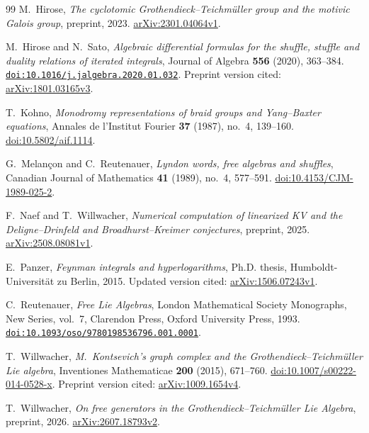 \documentclass[11pt]{article}
\theoremstyle{definition}
\theoremstyle{remark}
\numberwithin{equation}{section}
\begin{document}
\begin{thebibliography}{99}
M.~Hirose,
\emph{The cyclotomic Grothendieck--Teichm\"uller group and the motivic
Galois group},
preprint, 2023.
\href{https://arxiv.org/abs/2301.04064v1}{arXiv:2301.04064v1}.

M.~Hirose and N.~Sato,
\emph{Algebraic differential formulas for the shuffle, stuffle and duality
relations of iterated integrals},
Journal of Algebra \textbf{556} (2020), 363--384.
\href{https://doi.org/10.1016/j.jalgebra.2020.01.032}{\nolinkurl{doi:10.1016/j.jalgebra.2020.01.032}}.
Preprint version cited:
\href{https://arxiv.org/abs/1801.03165v3}{arXiv:1801.03165v3}.

T.~Kohno,
\emph{Monodromy representations of braid groups and Yang--Baxter equations},
Annales de l'Institut Fourier \textbf{37} (1987), no.~4, 139--160.
\href{https://doi.org/10.5802/aif.1114}{doi:10.5802/aif.1114}.

G.~Melan\c{c}on and C.~Reutenauer,
\emph{Lyndon words, free algebras and shuffles},
Canadian Journal of Mathematics \textbf{41} (1989), no.~4, 577--591.
\href{https://doi.org/10.4153/CJM-1989-025-2}{doi:10.4153/CJM-1989-025-2}.

F.~Naef and T.~Willwacher,
\emph{Numerical computation of linearized KV and the Deligne--Drinfeld and
Broadhurst--Kreimer conjectures},
preprint, 2025.
\href{https://arxiv.org/abs/2508.08081v1}{arXiv:2508.08081v1}.

E.~Panzer,
\emph{Feynman integrals and hyperlogarithms},
Ph.D. thesis, Humboldt-Universit\"at zu Berlin, 2015.
Updated version cited:
\href{https://arxiv.org/abs/1506.07243v1}{arXiv:1506.07243v1}.

C.~Reutenauer,
\emph{Free Lie Algebras},
London Mathematical Society Monographs, New Series, vol.~7,
Clarendon Press, Oxford University Press, 1993.
\newline
\href{https://doi.org/10.1093/oso/9780198536796.001.0001}{\nolinkurl{doi:10.1093/oso/9780198536796.001.0001}}.

T.~Willwacher,
\emph{M.~Kontsevich's graph complex and the Grothendieck--Teichm\"uller
Lie algebra},
Inventiones Mathematicae \textbf{200} (2015), 671--760.
\href{https://doi.org/10.1007/s00222-014-0528-x}{doi:10.1007/s00222-014-0528-x}.
Preprint version cited:
\href{https://arxiv.org/abs/1009.1654v4}{arXiv:1009.1654v4}.

T.~Willwacher,
\emph{On free generators in the Grothendieck--Teichm\"uller Lie Algebra},
preprint, 2026.
\href{https://arxiv.org/abs/2607.18793v2}{arXiv:2607.18793v2}.

\end{thebibliography}
\end{document}
